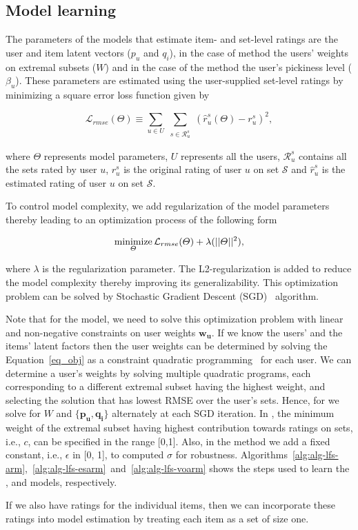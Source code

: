 \subsection{Model learning}\label{ch:lfs:model_learn}
The parameters of the models that estimate item- and set-level ratings are the
user and item latent vectors ($p_u$ and $q_i$), in the case of \ES method
the users' weights on extremal subsets ($W$) and in the case of the \VO method
the user's pickiness level ($\beta_u$). These parameters are estimated using the
user-supplied set-level ratings by minimizing a square error loss function given
by


%
\begin{equation} \label{eq_rmse}
  \mathcal{L}_{rmse}(\Theta) \equiv \sum_{u \in U} \sum_{\substack{s \in
  \mathcal{R}_{u}^s}} (\hat{r}_{u}^s(\Theta) - r_{u}^s)^2,
\end{equation}
%


\noindent where $\Theta$ represents model parameters, $U$ represents all the users, $\mathcal{R}_{u}^s$ contains all the sets rated 
by user $u$, $r_{u}^s$ is the original rating of user $u$ on set $\mathcal{S}$ 
and $\hat{r}_{u}^s$ is the estimated rating of user $u$ on set $\mathcal{S}$.

To control model complexity, we add regularization of the model parameters
thereby leading to an optimization process of the following form

%
\begin{equation} \label{eq_obj}
  \minimize_{\Theta} \mathcal{L}_{rmse}(\Theta)  + \lambda (||\Theta||^2),
\end{equation}

%
\noindent where $\lambda$ is the regularization parameter. The L2-regularization is added to 
reduce the model complexity thereby improving its generalizability. 
This optimization problem can be solved by Stochastic Gradient Descent
(SGD)~\cite{r22} algorithm. 


Note that for the \ES model, we
need to solve this optimization problem with linear and non-negative constraints
on user weights $\bm{w_u}$. If we know the users' and the items' latent factors
then the user weights can be determined by solving the Equation~\ref{eq_obj} as
a constraint quadratic programming~\cite{boyd2004convex} for each user. 
We can determine a user's weights by solving multiple quadratic programs, each
corresponding to a different extremal subset having the highest weight, and
selecting the solution that has lowest RMSE over the user's sets.
Hence, for \ES we solve for $W$ and $\{\bm{p_u}, \bm{q_i}\}$ alternately at each SGD iteration. 
In \ES, the minimum weight of the extremal subset having highest contribution towards
ratings on sets, i.e., $c$, can be specified in the range [0,1].
Also, in the \VO method 
we add a fixed constant, i.e., $\epsilon$ in [0, 1], to computed $\sigma$ for robustness.
Algorithms~\ref{alg:alg-lfs-arm},~\ref{alg:alg-lfs-esarm}~and~\ref{alg:alg-lfs-voarm}
shows the steps used to learn the \ARM,
\ES and \VO models, respectively.

If we also have ratings for the individual items, then we can incorporate these
ratings into model estimation by treating each item as a set of size one. 

